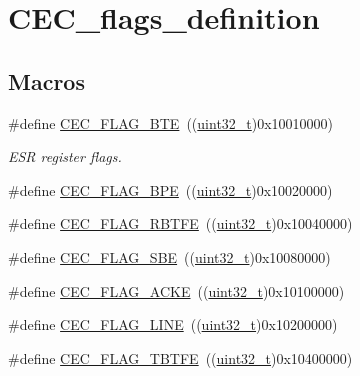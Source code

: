 \hypertarget{group___c_e_c__flags__definition}{}\section{C\+E\+C\+\_\+flags\+\_\+definition}
\label{group___c_e_c__flags__definition}
\subsection*{Macros}
\begin{DoxyCompactItemize}
\item 
\#define \hyperlink{group___c_e_c__flags__definition_ga66e91438a7df5d00db3c5410d8f7d456}{C\+E\+C\+\_\+\+F\+L\+A\+G\+\_\+\+B\+TE}~((\hyperlink{_p_e___types_8h_a33594304e786b158f3fb30289278f5af}{uint32\+\_\+t})0x10010000)
\begin{DoxyCompactList}\small\item\em E\+SR register flags. \end{DoxyCompactList}\item 
\#define \hyperlink{group___c_e_c__flags__definition_gaf2a5d5dcbc57fc0cf7cfa988533a2a09}{C\+E\+C\+\_\+\+F\+L\+A\+G\+\_\+\+B\+PE}~((\hyperlink{_p_e___types_8h_a33594304e786b158f3fb30289278f5af}{uint32\+\_\+t})0x10020000)
\item 
\#define \hyperlink{group___c_e_c__flags__definition_gafdfca815014dee4a458083337795c336}{C\+E\+C\+\_\+\+F\+L\+A\+G\+\_\+\+R\+B\+T\+FE}~((\hyperlink{_p_e___types_8h_a33594304e786b158f3fb30289278f5af}{uint32\+\_\+t})0x10040000)
\item 
\#define \hyperlink{group___c_e_c__flags__definition_gac77db62c05af2462ed3f1b64cef2e136}{C\+E\+C\+\_\+\+F\+L\+A\+G\+\_\+\+S\+BE}~((\hyperlink{_p_e___types_8h_a33594304e786b158f3fb30289278f5af}{uint32\+\_\+t})0x10080000)
\item 
\#define \hyperlink{group___c_e_c__flags__definition_ga1583b7a221e54f2f19cb121bf310547c}{C\+E\+C\+\_\+\+F\+L\+A\+G\+\_\+\+A\+C\+KE}~((\hyperlink{_p_e___types_8h_a33594304e786b158f3fb30289278f5af}{uint32\+\_\+t})0x10100000)
\item 
\#define \hyperlink{group___c_e_c__flags__definition_gaf751970725df12976dc6c8356910143a}{C\+E\+C\+\_\+\+F\+L\+A\+G\+\_\+\+L\+I\+NE}~((\hyperlink{_p_e___types_8h_a33594304e786b158f3fb30289278f5af}{uint32\+\_\+t})0x10200000)
\item 
\#define \hyperlink{group___c_e_c__flags__definition_gaae90fd2f95085e113b6943bb35d899ba}{C\+E\+C\+\_\+\+F\+L\+A\+G\+\_\+\+T\+B\+T\+FE}~((\hyperlink{_p_e___types_8h_a33594304e786b158f3fb30289278f5af}{uint32\+\_\+t})0x10400000)

\end{DoxyCompactItemize}
